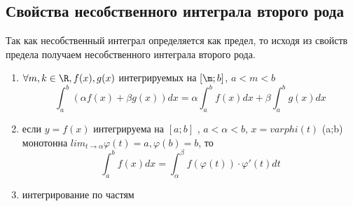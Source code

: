 \documentclass[oneside]{book}
\begin{document}
\begin{enumerate}
\begin{itemize}
\begin{enumerate}
\subsection{Свойства несобственного интеграла второго рода}
Так как несобственный интеграл определяется как предел, то исходя из свойств предела получаем несобственного интеграла второго рода.
\begin{enumerate}[label=\arabic*.]
\item $\forall m,k \in \R, f(x),g(x)$ интегрируемых на $[\m;b]$, $a<m<b$
$$\int_{a}^{b}(\alpha f(x)+\beta g(x))dx = \alpha \int_{a}^{b}f(x)dx+\beta \int_{a}^{b}g(x)dx$$

\item если $y=f(x)$ интегрируема на $[a;b]$ , $a<\alpha<b$, $x=varphi(t)$ (a;b) монотонна
$lim_{t\to\alpha} \varphi(t)=a, \varphi(b)=b$, то
$$\int_{a}^{b}f(x)dx=\int_{\alpha}^{\beta}f(\varphi(t))\cdot\varphi'(t)dt$$

\item интегрирование по частям
\end{enumerate}


\end{enumerate}
\end{itemize}
\end{enumerate}
\end{document}
